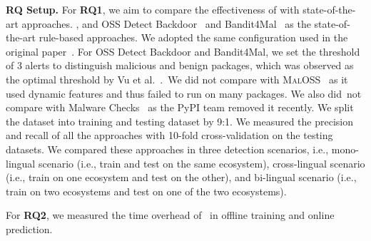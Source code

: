 
\textbf{RQ Setup.} For \textbf{RQ1}, we aim to compare the effectiveness of \tool with state-of-the-art approaches. , and OSS Detect Backdoor~\cite{Ossdetectbackdoor} and Bandit4Mal~\cite{bandit4mal} as the state-of-the-art rule-based approaches. We adopted the same configuration used in the original paper~\cite{sejfia2022practical, ladisa2023feasibility, liang2023needle}. For OSS Detect Backdoor and Bandit4Mal, we set the threshold of 3 alerts to distinguish malicious and benign packages, which was observed as the optimal threshold by Vu et al.~\cite{vu2023bad}.~We did not compare with \textsc{MalOSS}~\cite{duan2020towards} as it used dynamic features and thus failed to run on many packages. We also did~not compare with Malware Checks~\cite{malwarechecks} as the PyPI team removed it recently. We split the dataset into training and testing dataset by 9:1. We measured the precision and recall of all the approaches with 10-fold cross-validation on the testing datasets. We compared these approaches in three detection scenarios, i.e., mono-lingual scenario (i.e., train and test on the same ecosystem), cross-lingual scenario (i.e., train on one ecosystem and test on the other), and bi-lingual scenario (i.e., train on two ecosystems and test on one of the two ecosystems). 



For \textbf{RQ2}, we measured the time overhead of \tool~in offline training and online prediction. 


